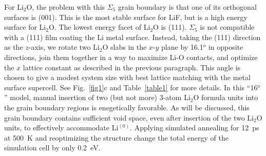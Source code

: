 \documentclass[prb,preprint,amsmath,amssymb]{revtex4}
\begin{document}
For Li$_2$O, the problem with this $\Sigma_5$ grain boundary is that one of
its orthogonal surfaces is (001).  This is the most stable surface for LiF, but
is a high energy surface for Li$_2$O.  The lowest energy facet of Li$_2$O
is (111).\cite{li2o} $\Sigma_5$ is not compatible with a (111) film coating
the Li metal surface.  Instead, taking the (111) direction as the $z$-axis,
we rotate two Li$_2$O slabs in the $x$-$y$ plane by 16.1$^o$ in opposite
directions, join them together in a way to maximize Li-O contacts, and optimize
the $x$ lattice constant as described in the previous paragraph.  This angle
is chosen to give a modest system size with best lattice matching with the
metal surface supercell.  See Fig.~\ref{fig1}c and Table~\ref{table1} for more
details.  In this ``16$^o$'' model, manual insertion of two (but not more)
3-atom Li$_2$O formula units into the grain boundary regions is enegetically
favorable.  As will be discussed, this grain boundary contains sufficient void
space, even after insertion of the two Li$_2$O units, to effectively
accommodate Li$^{(0)}$.  Applying simulated annealing for 12~ps at 500~K and
reoptimizing the structure change the total energy of the simulation
cell by only 0.2~eV.  
\end{document}
